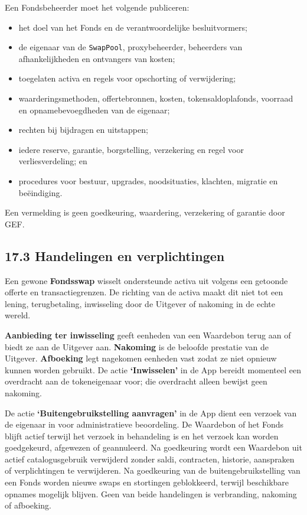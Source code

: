 \documentclass[11pt]{article}
\begin{document}
Een Fondsbeheerder moet het volgende publiceren:

\begin{itemize}[leftmargin=*]
\item het doel van het Fonds en de verantwoordelijke besluitvormers;
\item de eigenaar van de \texttt{SwapPool}, proxybeheerder, beheerders van afhankelijkheden en ontvangers van kosten;
\item toegelaten activa en regels voor opschorting of verwijdering;
\item waarderingsmethoden, offertebronnen, kosten, tokensaldoplafonds, voorraad en opnamebevoegdheden van de eigenaar;
\item rechten bij bijdragen en uitstappen;
\item iedere reserve, garantie, borgstelling, verzekering en regel voor verliesverdeling; en
\item procedures voor bestuur, upgrades, noodsituaties, klachten, migratie en beëindiging.
\end{itemize}
Een vermelding is geen goedkeuring, waardering, verzekering of garantie door GEF.

\subsection*{17.3 Handelingen en verplichtingen}

Een gewone \textbf{Fondsswap} wisselt ondersteunde activa uit volgens een getoonde offerte en transactiegrenzen. De richting van de activa maakt dit niet tot een lening, terugbetaling, inwisseling door de Uitgever of nakoming in de echte wereld.

\textbf{Aanbieding ter inwisseling} geeft eenheden van een Waardebon terug aan of biedt ze aan de Uitgever aan. \textbf{Nakoming} is de beloofde prestatie van de Uitgever. \textbf{Afboeking} legt nagekomen eenheden vast zodat ze niet opnieuw kunnen worden gebruikt. De actie \textbf{`Inwisselen'} in de App bereidt momenteel een overdracht aan de tokeneigenaar voor; die overdracht alleen bewijst geen nakoming.

De actie \textbf{`Buitengebruikstelling aanvragen'} in de App dient een verzoek van de eigenaar in voor administratieve beoordeling. De Waardebon of het Fonds blijft actief terwijl het verzoek in behandeling is en het verzoek kan worden goedgekeurd, afgewezen of geannuleerd. Na goedkeuring wordt een Waardebon uit actief catalogusgebruik verwijderd zonder saldi, contracten, historie, aanspraken of verplichtingen te verwijderen. Na goedkeuring van de buitengebruikstelling van een Fonds worden nieuwe swaps en stortingen geblokkeerd, terwijl beschikbare opnames mogelijk blijven. Geen van beide handelingen is verbranding, nakoming of afboeking.
\end{document}
